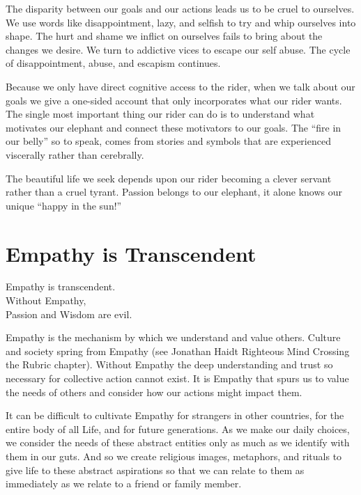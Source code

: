\documentclass[ebook,12pt,openany,twoside]{memoir}
\newcommand{\tab}{\hspace*{2em}}
\newcommand{\imagefacingchapter}[1]{
  \cleartoverso
  \clearpage \null
  \thispagestyle{cleared}
  \AddToShipoutPictureBG*{%
    \AtStockLowerLeft{%
      \texttt{[image: \#1]}
    }
  }
  \clearpage
}
\begin{document}
\noindent The disparity between our goals and our actions leads us to be cruel
to ourselves. We use words like disappointment, lazy, and selfish to try and
whip ourselves into shape. The hurt and shame we inflict on ourselves fails to
bring about the changes we desire. We turn to addictive vices to escape our
self abuse.  The cycle of disappointment, abuse, and escapism continues.

Because we only have direct cognitive access to the rider, when we talk about
our goals we give a one-sided account that only incorporates what our rider
wants. The single most important thing our rider can do is to understand what
motivates our elephant and connect these motivators to our goals. The ``fire in
our belly'' so to speak, comes from stories and symbols that are experienced
viscerally rather than cerebrally.

The beautiful life we seek depends upon our rider becoming a clever servant
rather than a cruel tyrant. Passion belongs to our elephant, it alone knows our
unique ``happy in the sun!''






\imagefacingchapter{images/EmpathyIsTranscendant}
\chapter{Empathy is Transcendent}

\setlength\epigraphwidth{2.4in}
\epigraph{
  Empathy is transcendent.\\
  Without Empathy,\\
  \tab Passion and Wisdom are evil.
}{}

\noindent Empathy is the mechanism by which we understand and value others.
Culture and society spring from Empathy (see Jonathan Haidt Righteous Mind
Crossing the Rubric chapter). Without Empathy the deep understanding and trust
so necessary for collective action cannot exist. It is Empathy that spurs us to
value the needs of others and consider how our actions might impact them.

It can be difficult to cultivate Empathy for strangers in other countries, for
the entire body of all Life, and for future generations. As we make our daily
choices, we consider the needs of these abstract entities only as much as we
identify with them in our guts. And so we create religious images, metaphors,
and rituals to give life to these abstract aspirations so that we can relate to
them as immediately as we relate to a friend or family member.
\end{document}
